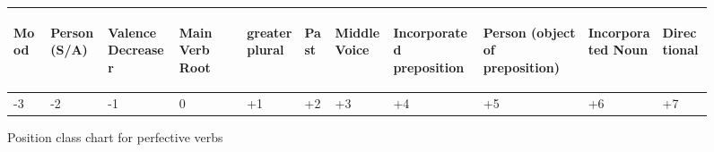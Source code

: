 \documentclass[output=paper]{langsci/langscibook}
\begin{document}
\begin{figure}
\begin{tabularx}{\textwidth}{XXXXXXXXXXp{2cm}}
\begin{turn}{33} Mood \end{turn} & \begin{turn}{33} Person (S/A) \end{turn} & \begin{turn}{33} Valence Decreaser \end{turn} & \begin{turn}{33} Main Verb Root \end{turn} & \begin{turn}{33} greater plural \end{turn} & \begin{turn}{33} Past \end{turn} & \begin{turn}{33} Middle Voice \end{turn} & \begin{turn}{33} Incorporated preposition \end{turn} & \begin{turn}{33} Person (object of preposition) \end{turn} & \begin{turn}{33} Incorporated Noun \end{turn} & \begin{turn}{33} Directional \end{turn} \\
\midrule
\multicolumn{1}{X}{{}-3} & \multicolumn{1}{X}{{}-2} & \multicolumn{1}{X}{{}-1} & \multicolumn{1}{X}{0} & \multicolumn{1}{X}{+1} & \multicolumn{1}{X}{+2} & \multicolumn{1}{X}{+3} & \multicolumn{1}{X}{+4} & \multicolumn{1}{X}{+5} & \multicolumn{1}{X}{+6} & +7\\
\end{tabularx}
\caption{Position class chart for  perfective verbs}
\label{fig:ahlandc:2}
\end{figure}
\end{document}

